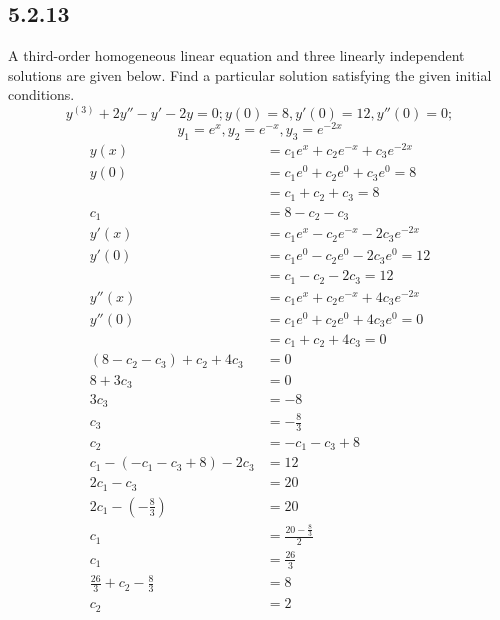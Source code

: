\documentclass{article}
\begin{document}
\subsection{5.2.13}

A third-order homogeneous linear equation and three linearly independent solutions are given below. Find a particular solution satisfying the given initial conditions.
$$ y^{(3)} + 2y'' - y' - 2y = 0; y(0) = 8, y'(0) = 12, y''(0) = 0; $$
$$ y_1 = e^x, y_2 = e^{-x}, y_3 = e^{-2x} $$
\begin{align*}
	y(x) & = c_1e^x + c_2e^{-x} + c_3e^{-2x} \\
	y(0) & = c_1e^0 + c_2e^0 + c_3e^0 = 8 \\
		 & = c_1 + c_2 + c_3 = 8 \\
	c_1 & = 8 - c_2 - c_3 \\
	y'(x) & = c_1e^x - c_2e^{-x} - 2c_3e^{-2x} \\
	y'(0) & = c_1e^0 - c_2e^0 - 2c_3e^0 = 12 \\
		  & = c_1 - c_2 - 2c_3 = 12 \\
	y''(x) & = c_1e^x + c_2e^{-x} + 4c_3e^{-2x} \\
	y''(0) & = c_1e^0 + c_2e^0 + 4c_3e^0 = 0 \\
		   & = c_1 + c_2 + 4c_3 = 0 \\
	(8 - c_2 - c_3) + c_2 + 4c_3 & = 0 \\
	8 + 3c_3 & = 0 \\
	3c_3 & = -8 \\
	c_3 & = -\frac{8}{3} \\
	c_2 & = -c_1 - c_3 + 8 \\
	c_1 - (-c_1 - c_3 + 8) - 2c_3 & = 12 \\
	2c_1 - c_3 & = 20 \\
	2c_1 - \left( -\frac{8}{3} \right) & = 20 \\
	c_1 & = \frac{20 - \frac{8}{3}}{2} \\
	c_1 & = \frac{26}{3} \\
	\frac{26}{3} + c_2 - \frac{8}{3} & = 8 \\
	c_2 & = 2
\end{align*}
\end{document}
